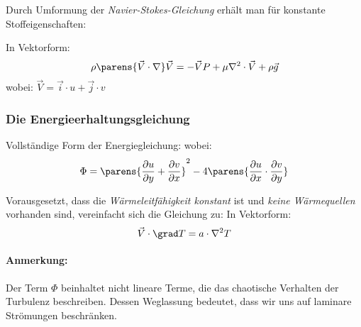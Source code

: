 			Durch Umformung der \emph{Navier-Stokes-Gleichung} erhält man für konstante Stoffeigenschaften:
			
			In Vektorform:
			\[
				\rho \parens{\vec V \cdot \nabla} \vec V = - \vec V P + \mu \nabla^2 \cdot \vec V + \rho \vec g
			\]
			wobei:
			$
				\vec V = \vec i \cdot u + \vec j \cdot v
			$
		\subsubsection{Die Energieerhaltungsgleichung} %
			Vollständige Form der Energiegleichung:
			wobei: \[
				\Phi = \parens{
					\frac{\partial u}{\partial y} + \frac{\partial v}{\partial x}
				}^2 - 4 \parens{
					\frac{\partial u}{\partial x} \cdot \frac{\partial v}{\partial y}
				}
			\]
			
			Vorausgesetzt, dass die \emph{Wärmeleitfähigkeit konstant} ist und \emph{keine Wärmequellen} vorhanden sind, vereinfacht sich die Gleichung zu:
			In Vektorform:
			\[
				\vec V \cdot \grad T = a\cdot \nabla^2T
			\]
			
			\paragraph{Anmerkung:} %
				Der Term $\Phi$ beinhaltet nicht lineare Terme, die das chaotische Verhalten der Turbulenz beschreiben. Dessen Weglassung bedeutet, dass wir uns auf laminare Strömungen beschränken.
